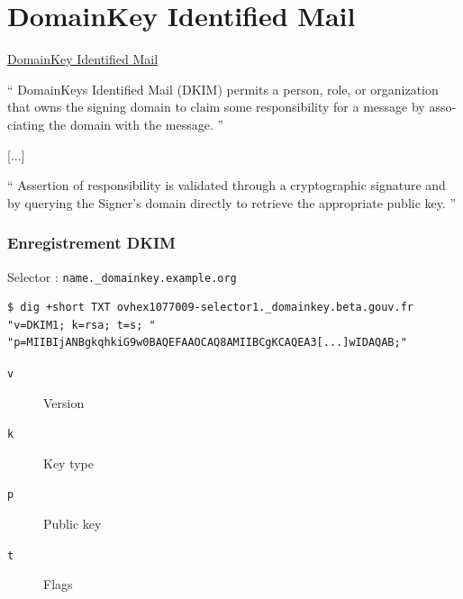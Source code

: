 \documentclass{beamer}
\begin{document}

\section{DomainKey Identified Mail}

\begin{frame}{\href{https://datatracker.ietf.org/doc/html/rfc6376}{DomainKey Identified Mail}}

    \foreignquote{english}{
        DomainKeys Identified Mail (DKIM) permits a person, role, or
        organization that owns the signing domain to claim some
        responsibility for a message by associating the domain with the
        message.
    }

    \vspace{0.2cm}
    [...]
    \vspace{0.2cm}

    \foreignquote{english}{
        Assertion of responsibility is validated through a cryptographic
        signature and by querying the Signer's domain directly to retrieve the
        appropriate public key.
    }
\end{frame}

\begin{frame}[fragile]
    \frametitle{Enregistrement DKIM}

    Selector : \texttt{name.\_domainkey.example.org}

    \begin{verbatim}
$ dig +short TXT ovhex1077009-selector1._domainkey.beta.gouv.fr
"v=DKIM1; k=rsa; t=s; "
"p=MIIBIjANBgkqhkiG9w0BAQEFAAOCAQ8AMIIBCgKCAQEA3[...]wIDAQAB;"
    \end{verbatim}

    \begin{description}
        \item[\texttt{v}] Version
        \item[\texttt{k}] Key type
        \item[\texttt{p}] Public key
        \item[\texttt{t}] Flags
    \end{description}
\end{frame}
\end{document}
